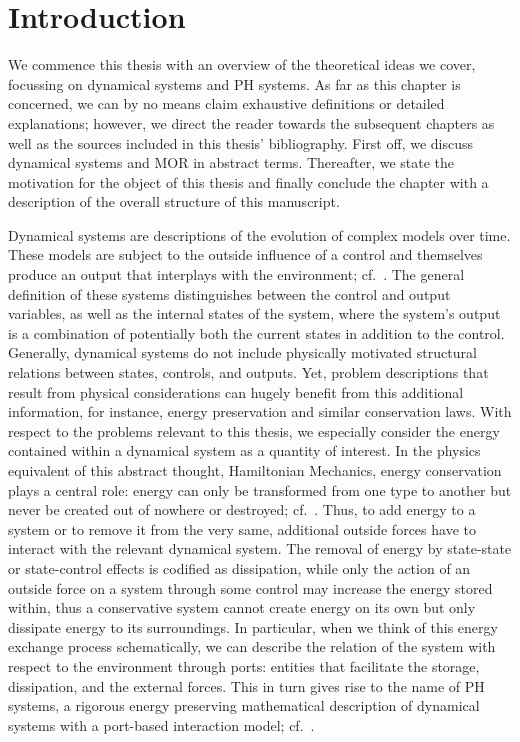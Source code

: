 \chapter{Introduction}\label{chap:introduction}

We commence this thesis with an overview of the theoretical ideas we cover, focussing on dynamical systems and \ac{PH} systems.
As far as this chapter is concerned, we can by no means claim exhaustive definitions or detailed explanations; however, we direct the reader towards the subsequent chapters as well as the sources included in this thesis' bibliography.
First off, we discuss dynamical systems and \ac{MOR} in abstract terms.
Thereafter, we state the motivation for the object of this thesis and finally conclude the chapter with a description of the overall structure of this manuscript.

Dynamical systems are descriptions of the evolution of complex models over time.
These models are subject to the outside influence of a control and themselves produce an output that interplays with the environment; cf.~\cite{Hinrichsen2005}.
The general definition of these systems distinguishes between the control and output variables, as well as the internal states of the system, where the system's output is a combination of potentially both the current states in addition to the control.
Generally, dynamical systems do not include physically motivated structural relations between states, controls, and outputs.
Yet, problem descriptions that result from physical considerations can hugely benefit from this additional information, for instance, energy preservation and similar conservation laws.
With respect to the problems relevant to this thesis, we especially consider the energy contained within a dynamical system as a quantity of interest.
In the physics equivalent of this abstract thought, Hamiltonian Mechanics, energy conservation plays a central role: energy can only be transformed from one type to another but never be created out of nowhere or destroyed; cf.~\cite{Taylor2005, Giorgilli2022}.
Thus, to add energy to a system or to remove it from the very same, additional outside forces have to interact with the relevant dynamical system.
The removal of energy by state-state or state-control effects is codified as dissipation, while only the action of an outside force on a system through some control may increase the energy stored within, thus a conservative system cannot create energy on its own but only dissipate energy to its surroundings.
In particular, when we think of this energy exchange process schematically, we can describe the relation of the system with respect to the environment through ports: entities that facilitate the storage, dissipation, and the external forces.
This in turn gives rise to the name of \ac{PH} systems, a rigorous energy preserving mathematical description of dynamical systems with a port-based interaction model; cf.~\cite{Duindam2009, Jacob2012, VanDerSchaft2014, Mehrmann2023}.

